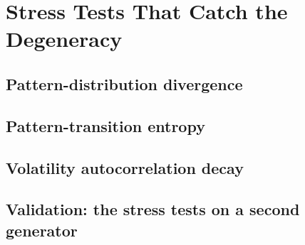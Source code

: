 \section{Stress Tests That Catch the Degeneracy}
\label{sec:stress}



\subsection{Pattern-distribution divergence}
\label{sec:stress:pdiv}


\subsection{Pattern-transition entropy}
\label{sec:stress:tentropy}


\subsection{Volatility autocorrelation decay}
\label{sec:stress:vol}


\subsection{Validation: the stress tests on a second generator}
\label{sec:stress:validation}

